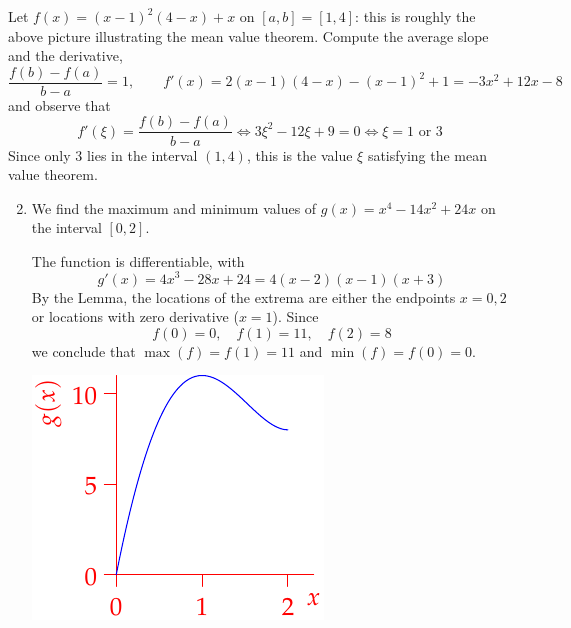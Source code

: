 \goodbreak


\begin{examples}{}{}
	\exstart Let $f(x)=(x-1)^2(4-x)+x$ on $[a,b]=[1,4]$: this is roughly the above picture illustrating the mean value theorem. Compute the average slope and the derivative,
	\[
		\frac{f(b)-f(a)}{b-a}=1,\qquad 
		f'(x)=2(x-1)(4-x)-(x-1)^2+1 =-3x^2+12x-8
	\]
	and observe that
	\[
		f'(\xi)=\frac{f(b)-f(a)}{b-a}\iff 3\xi^2-12\xi+9=0\iff \xi=1\text{ or }3
	\]
	Since only 3 lies in the interval $(1,4)$, this is the value $\xi$ satisfying the mean value theorem.
	\begin{enumerate}\setcounter{enumi}{1}
	  \item We find the maximum and minimum values of $g(x)=x^4-14x^2+24x$ on the interval $[0,2]$.\vspace{-8pt}
	  
	  \begin{minipage}[t]{0.68\linewidth}\vspace{0pt}
	  The function is differentiable, with
	  \[
	  	g'(x)=4x^3-28x+24=4(x-2)(x-1)(x+3)
	  \]
	  By the Lemma, the locations of the extrema are either the endpoints $x=0,2$ or locations with zero derivative ($x=1$). Since
	  \[
	  	f(0)=0,\quad f(1)=11,\quad f(2)=8
	  \]
	  we conclude that $\max(f)=f(1)=11$ and $\min(f)=f(0)=0$.
	  \end{minipage}
	  \hfill
	  \begin{minipage}[t]{0.31\linewidth}\vspace{0pt}
	  	\flushright\includegraphics[scale=0.95]{mvt-ex}
	  \end{minipage}
	\end{enumerate}
\end{examples}


